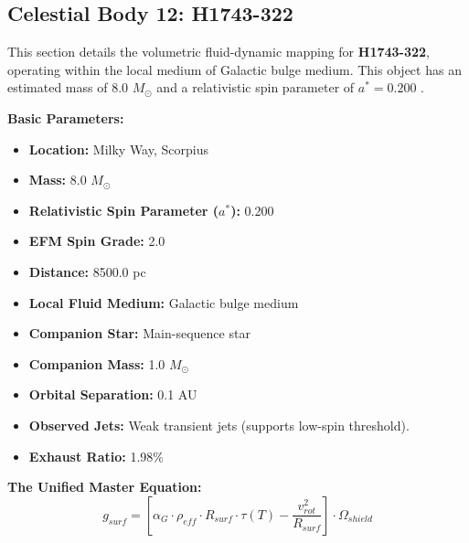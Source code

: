 \documentclass[11pt, a4paper]{article}
\begin{document}
\clearpage
\subsection{Celestial Body 12: H1743-322}
This section details the volumetric fluid-dynamic mapping for \textbf{H1743-322}, operating within the local medium of Galactic bulge medium. This object has an estimated mass of 8.0 $M_{\odot}$ and a relativistic spin parameter of $a^* = 0.200$ \cite{steiner2012, simbad}.

\vspace{0.5em}
\noindent \textbf{Basic Parameters:}
\begin{itemize}
  \item \textbf{Location:} Milky Way, Scorpius
  \item \textbf{Mass:} 8.0 $M_{\odot}$
  \item \textbf{Relativistic Spin Parameter ($a^*$):} 0.200
  \item \textbf{EFM Spin Grade:} 2.0
  \item \textbf{Distance:} 8500.0 pc
  \item \textbf{Local Fluid Medium:} Galactic bulge medium
  \item \textbf{Companion Star:} Main-sequence star
  \item \textbf{Companion Mass:} 1.0 $M_{\odot}$
  \item \textbf{Orbital Separation:} 0.1 AU
  \item \textbf{Observed Jets:} Weak transient jets (supports low-spin threshold).
  \item \textbf{Exhaust Ratio:} 1.98\%
\end{itemize}

\vspace{0.5em}
\noindent \textbf{The Unified Master Equation:}
$$ g_{surf} = \left[ \alpha_G \cdot \rho_{eff} \cdot R_{surf} \cdot \tau(T) - \frac{v_{rot}^2}{R_{surf}} \right] \cdot \Omega_{shield} $$
\end{document}
